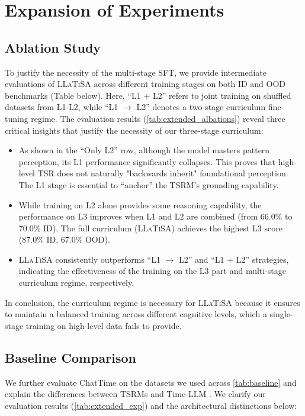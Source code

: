 \documentclass[11pt]{article}
\begin{document}
\section{Expansion of  Experiments}
\subsection{Ablation Study}
To justify the necessity of the multi-stage SFT, we provide intermediate evaluations of \textsc{LLaTiSA} across different training stages on both ID and OOD benchmarks (Table below). Here, ``L1 + L2'' refers to joint training on shuffled datasets from L1-L2, while ``L1 $\rightarrow$ L2'' denotes a two-stage curriculum fine-tuning regime. The evaluation results (\cref{tab:extended_albations}) reveal three critical insights that justify the necessity of our three-stage curriculum:
\begin{itemize}[left=0pt]
    \item As shown in the ``Only L2'' row, although the model masters pattern perception, its L1 performance significantly collapses. This proves that high-level TSR does not naturally "backwards inherit" foundational perception. The L1 stage is essential to ``anchor'' the TSRM's grounding capability.
    \item While training on L2 alone provides some reasoning capability, the performance on L3 improves when L1 and L2 are combined (from 66.0\% to 70.0\% ID). The full curriculum (\textsc{LLaTiSA}) achieves the highest L3 score (87.0\% ID, 67.0\% OOD).
    \item \textsc{LLaTiSA} consistently outperforms ``L1 $\rightarrow$ L2'' and ``L1 + L2'' strategies, indicating the effectiveness of the training on the L3 part and multi-stage curriculum regime, respectively.
\end{itemize}
In conclusion, the curriculum regime is necessary for \textsc{LLaTiSA} because it ensures to maintain a balanced training across different cognitive levels, which a single-stage training on high-level data fails to provide.

\subsection{Baseline Comparison}
We further evaluate ChatTime \cite{chattime} on the datasets we used across \cref{tab:baseline} and explain the differences between TSRMs and Time-LLM \cite{timellm}. We clarify our evaluation results (\cref{tab:extended_exp}) and the architectural distinctions below:
\end{document}
